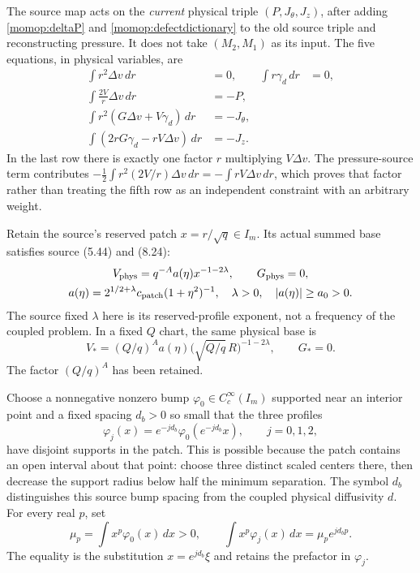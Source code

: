 The source map acts on the \emph{current} physical triple
$(P,J_\theta,J_z)$, after adding \eqref{momop:deltaP} and
\eqref{momop:defectdictionary} to the old source triple and
reconstructing pressure. It does not take
$(M_2,M_1)$ as its input. The five equations, in physical variables, are
\begin{align}
 \int r^2\Delta v\,dr&=0,&
 \int r\gamma_d\,dr&=0,\nonumber\\
 \int\frac{2V}{r}\Delta v\,dr&=-P,\nonumber\\
 \int r^2(G\Delta v+V\gamma_d)\,dr&=-J_\theta,\nonumber\\
 \int(2rG\gamma_d-rV\Delta v)\,dr&=-J_z .
 \label{momop:fivephysical}
\end{align}
In the last row there is exactly one factor $r$ multiplying $V\Delta v$.
The pressure-source term contributes
$-\tfrac12\int r^2(2V/r)\Delta v\,dr=-\int rV\Delta v\,dr$,
which proves that factor rather than treating the fifth row as an
independent constraint with an arbitrary weight.

Retain the source's reserved patch $x=r/\sqrt q\in I_m$. Its actual
summed base satisfies source (5.44) and (8.24):
\[
\begin{gathered}
 V_{\rm phys}=q^{-A}a(\eta)x^{-1-2\lambda},\qquad
 G_{\rm phys}=0,\\
 a(\eta)=2^{1/2+\lambda}c_{\rm patch}(1+\eta^2)^{-1},
 \quad \lambda>0,\quad |a(\eta)|\ge a_0>0.
\end{gathered}
\]
The source fixed $\lambda$ here is its reserved-profile exponent,
not a frequency of the coupled problem. In a fixed $Q$ chart,
the same physical base is
\[
 V_*=(Q/q)^A a(\eta)\bigl(\sqrt{Q/q}\,R\bigr)^{-1-2\lambda},
 \qquad G_*=0.
\]
The factor $(Q/q)^A$ has been retained.

Choose a nonnegative nonzero bump $\varphi_0\in C_c^\infty(I_m)$
supported near an interior point and a fixed spacing $d_b>0$ so small
that the three profiles
\[
 \varphi_j(x)=e^{-jd_b}\varphi_0(e^{-jd_b}x),\qquad j=0,1,2,
\]
have disjoint supports in the patch. This is possible because the patch
contains an open interval about that point: choose three distinct
scaled centers there, then decrease the support radius below half the
minimum separation. The symbol $d_b$ distinguishes this source bump
spacing from the coupled physical diffusivity $d$.
For every real $p$, set
\[
 \mu_p=\int x^p\varphi_0(x)\,dx>0,\qquad
 \int x^p\varphi_j(x)\,dx=\mu_pe^{jd_bp}.
\]
The equality is the substitution $x=e^{jd_b}\xi$ and retains the
prefactor in $\varphi_j$.

